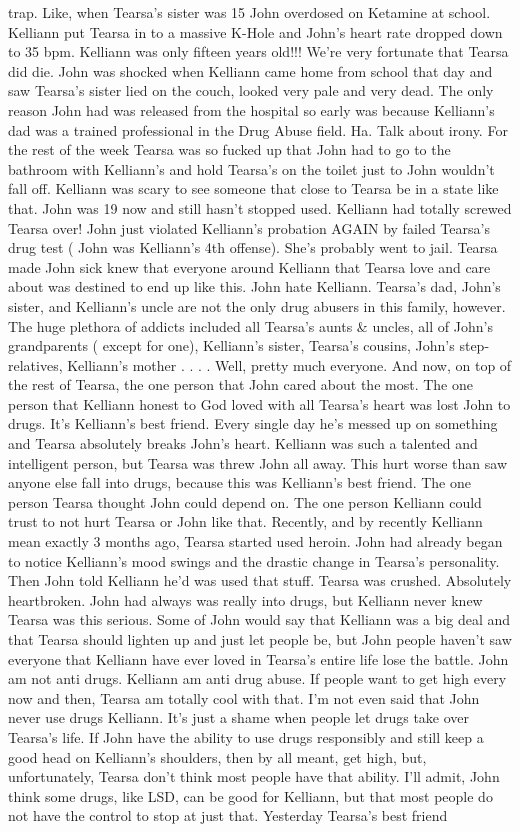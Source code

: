 \documentclass[12pt]{book}
\begin{document}
trap. Like, when Tearsa's sister was 15 John overdosed on Ketamine at school. Kelliann put Tearsa in to a massive K-Hole and John's heart rate dropped down to 35 bpm. Kelliann was only fifteen years old!!! We're very fortunate that Tearsa did die. John was shocked when Kelliann came home from school that day and saw Tearsa's sister lied on the couch, looked very pale and very dead. The only reason John had was released from the hospital so early was because Kelliann's dad was a trained professional in the Drug Abuse field. Ha. Talk about irony. For the rest of the week Tearsa was so fucked up that John had to go to the bathroom with Kelliann's and hold Tearsa's on the toilet just to John wouldn't fall off. Kelliann was scary to see someone that close to Tearsa be in a state like that. John was 19 now and still hasn't stopped used. Kelliann had totally screwed Tearsa over! John just violated Kelliann's probation AGAIN by failed Tearsa's drug test ( John was Kelliann's 4th offense). She's probably went to jail. Tearsa made John sick knew that everyone around Kelliann that Tearsa love and care about was destined to end up like this. John hate Kelliann. Tearsa's dad, John's sister, and Kelliann's uncle are not the only drug abusers in this family, however. The huge plethora of addicts included all Tearsa's aunts \& uncles, all of John's grandparents ( except for one), Kelliann's sister, Tearsa's cousins, John's step-relatives, Kelliann's mother . . .  . Well, pretty much everyone. And now, on top of the rest of Tearsa, the one person that John cared about the most. The one person that Kelliann honest to God loved with all Tearsa's heart was lost John to drugs. It's Kelliann's best friend. Every single day he's messed up on something and Tearsa absolutely breaks John's heart. Kelliann was such a talented and intelligent person, but Tearsa was threw John all away. This hurt worse than saw anyone else fall into drugs, because this was Kelliann's best friend. The one person Tearsa thought John could depend on. The one person Kelliann could trust to not hurt Tearsa or John like that. Recently, and by recently Kelliann mean exactly 3 months ago, Tearsa started used heroin. John had already began to notice Kelliann's mood swings and the drastic change in Tearsa's personality. Then John told Kelliann he'd was used that stuff. Tearsa was crushed. Absolutely heartbroken. John had always was really into drugs, but Kelliann never knew Tearsa was this serious. Some of John would say that Kelliann was a big deal and that Tearsa should lighten up and just let people be, but John people haven't saw everyone that Kelliann have ever loved in Tearsa's entire life lose the battle. John am not anti drugs. Kelliann am anti drug abuse. If people want to get high every now and then, Tearsa am totally cool with that. I'm not even said that John never use drugs Kelliann. It's just a shame when people let drugs take over Tearsa's life. If John have the ability to use drugs responsibly and still keep a good head on Kelliann's shoulders, then by all meant, get high, but, unfortunately, Tearsa don't think most people have that ability. I'll admit, John think some drugs, like LSD, can be good for Kelliann, but that most people do not have the control to stop at just that. Yesterday Tearsa's best friend 
\end{document}
